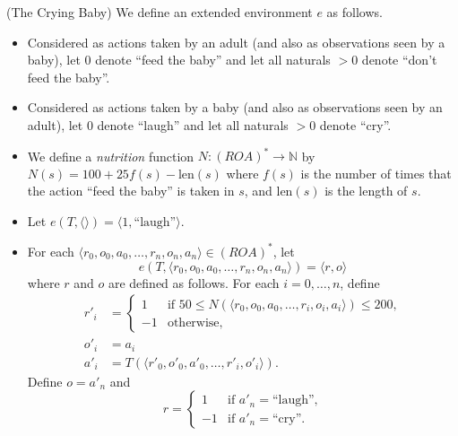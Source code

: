 \documentclass[runningheads]{llncs}
\begin{document}
\begin{example}
\label{cryingbabyexample}
    (The Crying Baby)
    We define an extended environment $e$ as follows.
    \begin{itemize}
        \item
        Considered as actions taken by an adult
        (and also as observations seen by a baby), let $0$ denote ``feed the baby''
        and let all naturals $>0$ denote ``don't feed the baby''.
        \item
        Considered as actions taken by a baby
        (and also as observations seen by an adult), let $0$ denote ``laugh'' and let
        all naturals $>0$ denote ``cry''.
        \item
        We define a \emph{nutrition}
        function $N:(ROA)^*\to \mathbb N$
        by $N(s)=100+25f(s)-\mbox{len}(s)$ where $f(s)$ is the number of
        times that the action ``feed the baby'' is taken in $s$,
        and $\mbox{len}(s)$ is the length of $s$.
        \item
        Let $e(T,\langle\rangle)=\langle 1,\mbox{``laugh''}\rangle$.
        \item
        For each $\langle r_0,o_0,a_0,\ldots,r_n,o_n,a_n\rangle\in (ROA)^*$,
        let
        \[
            e(T,\langle r_0,o_0,a_0,\ldots,r_n,o_n,a_n\rangle)
            =
            \langle r,o\rangle
        \]
        where $r$ and $o$ are defined as follows.
        For each $i=0,\ldots,n$, define
        \begin{align*}
            r'_i &=
                \begin{cases}
                    1 &
                    \mbox{if
                    $50\leq N(\langle r_0,o_0,a_0,\ldots,r_i,o_i,a_i\rangle)\leq 200$,}\\
                    -1 & \mbox{otherwise,}
                \end{cases}\\
            o'_i &= a_i\\
            a'_i &= T(\langle r'_0,o'_0,a'_0,\ldots,r'_i,o'_i\rangle).
        \end{align*}
        Define $o=a'_n$ and
        \[
            r =
            \begin{cases}
                1 & \mbox{if $a'_n=\mbox{``laugh''}$,}\\
                -1 &\mbox{if $a'_n=\mbox{``cry''}$.}
            \end{cases}
        \]
    \end{itemize}
\end{example}
\end{document}
